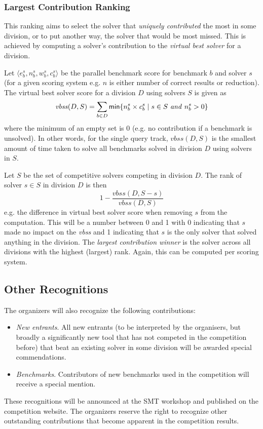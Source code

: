 \documentclass[12pt]{article}
\begin{document}
\subsubsection{Largest Contribution Ranking}

This ranking aims to select the solver that \emph{uniquely contributed} the most in some division, or to put another way, the solver that would be most missed. This is achieved by computing a solver's contribution to the \emph{virtual best solver} for a division.

Let $\langle e_b^s, n_b^s, w_b^s, c_b^s \rangle$ be the parallel benchmark score for benchmark $b$ and solver $s$ (for a given scoring system e.g. $n$ is either number of correct results or reduction). 
The virtual best solver score for a division $D$ using solvers $S$ is given as 
\[
\mathit{vbss}(D,S) = \sum_{b \in D} {\sf min}\{ n_b^s \times c_b^s \mid s \in S ~\mathit{and}~ n_b^s > 0  \}
\]
where the minimum of an empty set is 0 (e.g. no contribution if a benchmark is unsolved). In other words, for the single query track, $\mathit{vbss}(D,S)$ is the smallest amount of time taken to solve all benchmarks solved in division $D$ using solvers in $S$.

Let $S$ be the set of competitive solvers competing in division $D$. The rank of solver $s \in S$ in division $D$ is then
\[
1- \frac{\mathit{vbss}(D,S-s) }{ \mathit{vbss}(D,S)}
\]
e.g. the difference in virtual best solver score when removing $s$ from the computation. This will be a number between 0 and 1 with 0 indicating that $s$ made no impact on the \emph{vbss} and 1 indicating that $s$ is the only solver that solved anything in the division. 
%
The \emph{largest contribution winner} is the solver across all divisions with the highest (largest) rank. Again, this can be computed per scoring system.

\subsection{Other Recognitions}

The organizers will also recognize the following contributions:
%
\begin{itemize}
\item \emph{New entrants}. All new entrants (to be interpreted by the organisers, but broadly a significantly new tool that has not competed in the competition before) that beat an existing solver in some division will be awarded special commendations.
\item \emph{Benchmarks}. Contributors of new benchmarks used in the competition will receive a special mention.
\end{itemize}
%
These recognitions will be announced at the SMT workshop and published on the competition website. 
The organizers reserve the right to recognize other outstanding
contributions that become apparent in the competition results.
\end{document}
